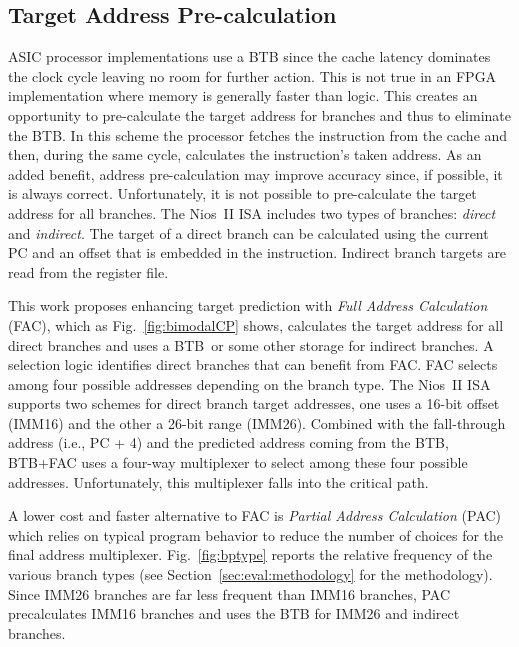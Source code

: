 \subsection{Target Address Pre-calculation}
\label{sec:min:target:addrprecalc}
ASIC processor implementations use a BTB since the cache latency dominates the clock cycle leaving no room for further action. This is not true in an FPGA implementation where memory is generally faster than logic. This creates an opportunity to pre-calculate the target address for branches and thus to eliminate the BTB. In this scheme the processor fetches the instruction from the cache and then, during the same cycle, calculates the instruction's taken address. As an added benefit, address pre-calculation may improve accuracy since, if possible, it is always correct. Unfortunately, it is not possible to pre-calculate the target address for all branches. The Nios~II ISA includes two types of branches: \textit{direct} and \textit{indirect}. The target of a direct branch can be calculated using the current PC and an offset that is embedded in the instruction. Indirect branch targets are read from the register file.  

This work proposes enhancing target prediction with \textit{Full Address Calculation} (FAC), which as Fig.~\ref{fig:bimodalCP} shows, calculates the target address for all direct branches and uses a BTB\ or some other storage for indirect branches. A selection logic identifies direct branches that can benefit from FAC. FAC selects among four possible addresses depending on the branch type. The Nios~II ISA supports two schemes for direct branch target addresses, one uses a 16-bit offset (IMM16) and the other a 26-bit range (IMM26). Combined with the fall-through address (i.e., PC + 4) and the predicted address coming from the BTB, BTB+FAC uses a four-way multiplexer to select among these four possible addresses. Unfortunately, this multiplexer falls into the critical path. 

A lower cost and faster alternative to FAC is \textit{Partial Address Calculation} (PAC) which relies on typical program behavior to reduce the number of choices for the final address multiplexer. Fig.~\ref{fig:bptype} reports the relative frequency of the various branch types (see Section~\ref{sec:eval:methodology} for the methodology). Since IMM26 branches are far less frequent than IMM16 branches, PAC precalculates IMM16 branches and uses the BTB for IMM26 and indirect branches.


